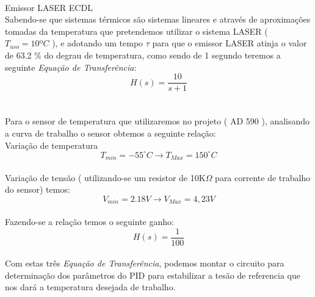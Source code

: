 \paragraph{}
Emissor LASER ECDL\\
Sabendo-se que sistemas térmicos são sistemas lineares e através de aproximações tomadas da temperatura que pretendemos utilizar o sistema LASER ( $T_{uso}= 10ºC$ ), e adotando um tempo  $ \tau $ para que o emissor LASER atinja o valor de 63.2 $\%$ do degrau de temperatura, como sendo de 1 segundo teremos a seguinte \emph{Equação de Transferência}:\\
\[H(s)= \frac{10}{s+1}\]\\
\paragraph{}
Para o sensor de temperatura que utilizaremos no projeto ( AD 590 ), analisando a curva de trabalho o sensor obtemos a seguinte relação:\\
Variação de temperatura\\
\[T_{min}=-55^{\circ}C \rightarrow T_{Max}=150^{\circ}C\]\\
Variação de tensão ( utilizando-se um resistor de 10K$ \Omega $ para corrente de trabalho do sensor) temos:\\
\[V_{min}=2.18 V \rightarrow V_{Max}=4,23 V\]\\
Fazendo-se a relação temos o seguinte ganho:\\
\[H(s)= \frac{1}{100}\]\\
Com estas três \emph{Equação de Transferência}, podemos montar o circuito para determinação dos parâmetros do PID para estabilizar a tesão de referencia que nos dará a temperatura desejada de trabalho.\\









 
